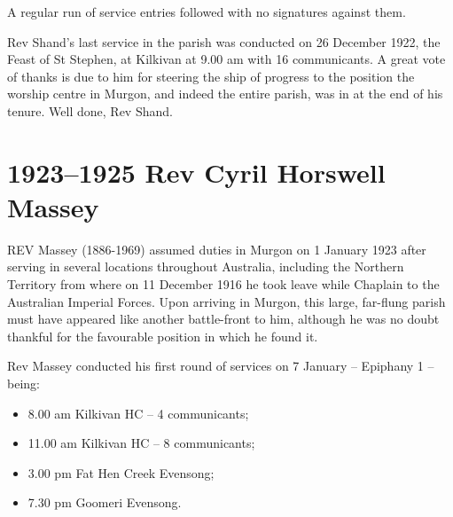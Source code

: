 A regular run of service entries followed with no signatures against them.



Rev Shand's last service in the parish was conducted on 26 December 1922, the Feast of St Stephen, at Kilkivan at 9.00 am with 16 communicants. A great vote of thanks is due to him for steering the ship of progress to the position the worship centre in Murgon, and indeed the entire parish, was in at the end of his tenure. Well done, Rev Shand.



\newpage


\printendnotes[custom]
\setcounter{endnote}{0}


\begin{quote}

\end{quote}





\chapter{1923--1925 Rev Cyril Horswell Massey}
\nobalance


\lettrine[lines=3]{R}{EV}
 Massey (1886-1969) assumed duties in Murgon on 1 January 1923 after serving in several locations throughout Australia, including the Northern Territory from where on 11 December 1916 he took leave while Chaplain to the Australian Imperial Forces. Upon arriving in Murgon, this large, far-flung parish must have appeared like another battle-front to him, although he was no doubt thankful for the favourable position in which he found it.

Rev Massey conducted his first round of services on 7 January -- Epiphany 1 -- being:



\begin{itemize}

\item

  8.00 am Kilkivan HC -- 4 communicants;

\item

  11.00 am Kilkivan HC -- 8 communicants;

\item

  3.00 pm Fat Hen Creek Evensong;

\item

  7.30 pm Goomeri Evensong.

\end{itemize}



